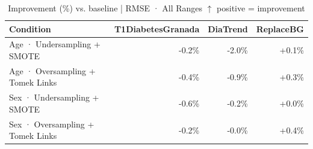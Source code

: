 \begin{table}[htbp]
\centering
\small
\caption{Improvement (\%) vs. baseline  |  RMSE · All Ranges  $\uparrow$ positive = improvement}
\label{tab:delta_rmse_entire_family_mechanism_random+guided}
\begin{tabular}{lrrr}
\toprule
\textbf{Condition} & \textbf{T1DiabetesGranada} & \textbf{DiaTrend} & \textbf{ReplaceBG} \\
\midrule
Age · Undersampling + SMOTE & \textcolor{BrickRed}{-0.2\%} & \textcolor{BrickRed}{-2.0\%} & \textcolor{OliveGreen}{+0.1\%} \\
Age · Oversampling + Tomek Links & \textcolor{BrickRed}{-0.4\%} & \textcolor{BrickRed}{-0.9\%} & \textcolor{OliveGreen}{+0.3\%} \\
\midrule
Sex · Undersampling + SMOTE & \textcolor{BrickRed}{-0.6\%} & \textcolor{BrickRed}{-0.2\%} & \textcolor{OliveGreen}{+0.0\%} \\
Sex · Oversampling + Tomek Links & \textcolor{BrickRed}{-0.2\%} & \textcolor{BrickRed}{-0.0\%} & \textcolor{OliveGreen}{+0.4\%} \\
\bottomrule
\end{tabular}
\end{table}
